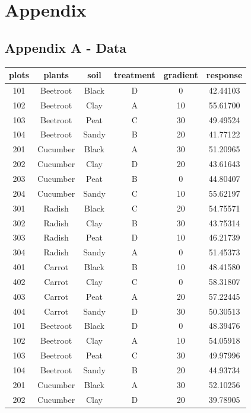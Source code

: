 \documentclass{article}
\begin{document}
\newpage

\section{Appendix}

\subsection{Appendix A - Data}
\begin{table}[h]
\centering
\small
\begin{tabular}{|c|c|c|c|c|c|}

\hline
plots & plants & soil & treatment & gradient & response \\
\hline
101 & Beetroot & Black & D & 0 & 42.44103 \\
102 & Beetroot & Clay & A & 10 & 55.61700 \\
103 & Beetroot & Peat & C & 30 & 49.49524 \\
104 & Beetroot & Sandy & B & 20 & 41.77122 \\
201 & Cucumber & Black & A & 30 & 51.20965 \\
202 & Cucumber & Clay & D & 20 & 43.61643 \\
203 & Cucumber & Peat & B & 0 & 44.80407 \\
204 & Cucumber & Sandy & C & 10 & 55.62197 \\
301 & Radish & Black & C & 20 & 54.75571 \\
302 & Radish & Clay & B & 30 & 43.75314 \\
303 & Radish & Peat & D & 10 & 46.21739 \\
304 & Radish & Sandy & A & 0 & 51.45373 \\
401 & Carrot & Black & B & 10 & 48.41580 \\
402 & Carrot & Clay & C & 0 & 58.31807 \\
403 & Carrot & Peat & A & 20 & 57.22445 \\
404 & Carrot & Sandy & D & 30 & 50.30513 \\
101 & Beetroot & Black & D & 0 & 48.39476 \\
102 & Beetroot & Clay & A & 10 & 54.05918 \\
103 & Beetroot & Peat & C & 30 & 49.97996 \\
104 & Beetroot & Sandy & B & 20 & 44.93734 \\
201 & Cucumber & Black & A & 30 & 52.10256 \\
202 & Cucumber & Clay & D & 20 & 39.78905 \\

\end{tabular}
\end{table}
\end{document}
